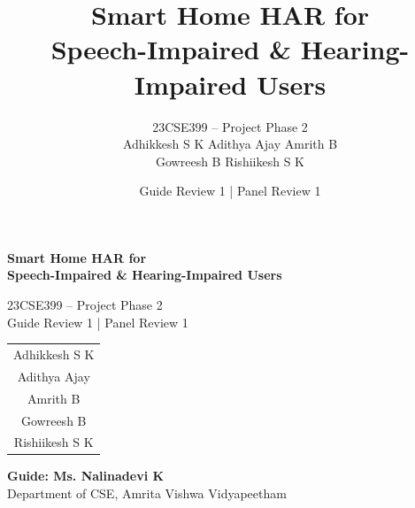 \documentclass[aspectratio=169,11pt]{beamer}
\title{
    \textbf{Smart Home HAR for}\\
    \textbf{Speech-Impaired \& Hearing-Impaired Users}
}
\author{
    23CSE399 -- Project Phase 2\\[3mm]
    \small
    Adhikkesh S K \quad
    Adithya Ajay \quad
    Amrith B\\
    Gowreesh B \quad
    Rishiikesh S K
}
\institute{
    Department of Computer Science and Engineering\\
    Amrita Vishwa Vidyapeetham
}
\date{
    Guide Review 1 \;|\; Panel Review 1
}
\begin{document}

\begin{frame}

    \vspace{0.7cm}

    \begin{center}
        {\color{AmritaMaroon}\Large\bfseries
        Smart Home HAR for}\\[0.15cm]

        {\color{AmritaMaroon}\LARGE\bfseries
        Speech-Impaired \& Hearing-Impaired Users}

        \vspace{0.45cm}

        {\large 23CSE399 -- Project Phase 2}\\
        {\large Guide Review 1 \;|\; Panel Review 1}

        \vspace{0.45cm}

        \begin{tabular}{c}
        Adhikkesh S K\\
        Adithya Ajay\\
        Amrith B\\
        Gowreesh B\\
        Rishiikesh S K
        \end{tabular}

        \vspace{0.35cm}

        \textbf{Guide: Ms. Nalinadevi K}\\
        Department of CSE, Amrita Vishwa Vidyapeetham
    \end{center}
\end{frame}


\end{document}
